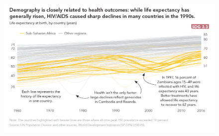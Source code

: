 \documentclass[]{book}
\theoremstyle{definition}
\theoremstyle{definition}
\theoremstyle{definition}
\theoremstyle{remark}
\begin{document}
\begin{figure}
\centering
\includegraphics{images/case study 1.png}
\caption{}
\end{figure}
\end{document}
